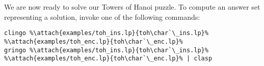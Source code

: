 We are now ready to solve our Towers of Hanoi puzzle. 
To compute an answer set representing a solution,
invoke one of the following commands:%
%
\begin{lstlisting}[numbers=none,escapechar=\%]
clingo %\attach{examples/toh_ins.lp}{toh\char`\_ins.lp}% %\attach{examples/toh_enc.lp}{toh\char`\_enc.lp}%
gringo %\attach{examples/toh_ins.lp}{toh\char`\_ins.lp}% %\attach{examples/toh_enc.lp}{toh\char`\_enc.lp}% | clasp
\end{lstlisting}

